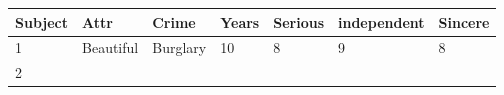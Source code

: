\documentclass[]{book}
\begin{document}
\begin{longtable}[]{@{}lllllll@{}}
\toprule
\begin{minipage}[b]{0.11\columnwidth}\raggedright\strut
Subject\strut
\end{minipage} & \begin{minipage}[b]{0.13\columnwidth}\raggedright\strut
Attr\strut
\end{minipage} & \begin{minipage}[b]{0.13\columnwidth}\raggedright\strut
Crime\strut
\end{minipage} & \begin{minipage}[b]{0.09\columnwidth}\raggedright\strut
Years\strut
\end{minipage} & \begin{minipage}[b]{0.11\columnwidth}\raggedright\strut
Serious\strut
\end{minipage} & \begin{minipage}[b]{0.15\columnwidth}\raggedright\strut
independent\strut
\end{minipage} & \begin{minipage}[b]{0.09\columnwidth}\raggedright\strut
Sincere\strut
\end{minipage}\tabularnewline
\midrule
\endhead
\begin{minipage}[t]{0.11\columnwidth}\raggedright\strut
1\strut
\end{minipage} & \begin{minipage}[t]{0.13\columnwidth}\raggedright\strut
Beautiful\strut
\end{minipage} & \begin{minipage}[t]{0.13\columnwidth}\raggedright\strut
Burglary\strut
\end{minipage} & \begin{minipage}[t]{0.09\columnwidth}\raggedright\strut
10\strut
\end{minipage} & \begin{minipage}[t]{0.11\columnwidth}\raggedright\strut
8\strut
\end{minipage} & \begin{minipage}[t]{0.15\columnwidth}\raggedright\strut
9\strut
\end{minipage} & \begin{minipage}[t]{0.09\columnwidth}\raggedright\strut
8\strut
\end{minipage}\tabularnewline
\begin{minipage}[t]{0.11\columnwidth}\raggedright\strut
2\strut
\end{minipage} & \begin{minipage}[t]{0.13\columnwidth}\raggedright\strut

\end{minipage}
\end{longtable}
\end{document}
